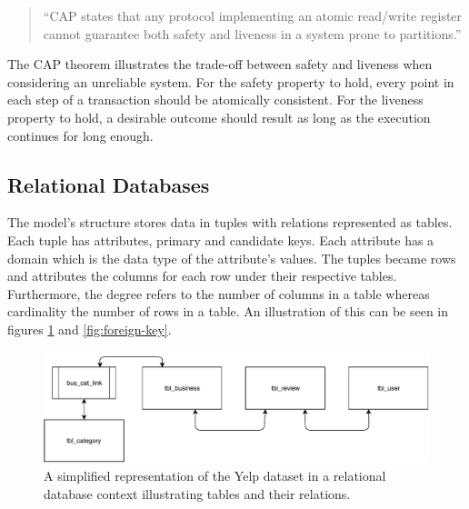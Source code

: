 \begin{quote}
    ``CAP states that any protocol implementing an atomic read/write register cannot guarantee both safety and liveness in a system prone to partitions.''
\end{quote}

The CAP theorem illustrates the trade-off between safety and liveness when considering an unreliable system. For the safety property to hold, every point in each step of a transaction should be atomically consistent. For the liveness property to hold, a desirable outcome should result as long as the execution continues for long enough.

\subsection{Relational Databases}



The model's structure stores data in tuples with relations represented as tables. Each tuple has attributes, primary and candidate keys. Each attribute has a domain which is the data type of the attribute's values. The tuples became rows and attributes the columns for each row under their respective tables. Furthermore, the degree refers to the number of columns in a table whereas cardinality the number of rows in a table. An illustration of this can be seen in figures \ref{fig:relational-database} and \ref{fig:foreign-key}.

\begin{figure}[h]
    \centering
    \includegraphics[width=15cm]{img/relational-database.pdf}
    \caption{A simplified representation of the Yelp dataset in a relational database context illustrating tables and their relations.}
    \label{fig:relational-database}
\end{figure}

